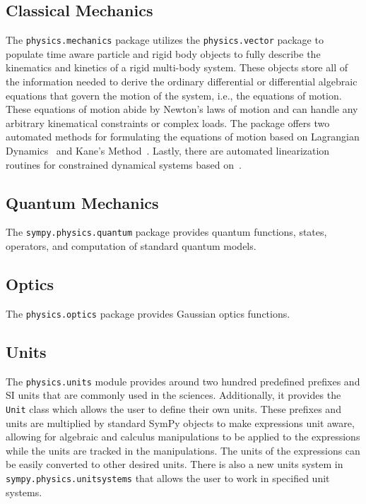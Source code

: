 \subsection{Classical Mechanics}

The \verb|physics.mechanics| package utilizes the \verb|physics.vector| package
to populate time aware particle and rigid body objects to fully describe the
kinematics and kinetics of a rigid multi-body system. These objects store all
of the information needed to derive the ordinary differential or differential
algebraic equations that govern the motion of the system, i.e., the equations
of motion. These equations of motion abide by Newton's laws of motion and can
handle any arbitrary kinematical constraints or complex loads. The package
offers two automated methods for formulating the equations of motion based on
Lagrangian Dynamics~\cite{Lagrange1811} and Kane's Method~\cite{Kane1985}. Lastly, there
are automated linearization routines for constrained dynamical
systems based on~\cite{Peterson2014}.

\subsection{Quantum Mechanics}

The \verb|sympy.physics.quantum| package provides quantum functions, states,
operators, and computation of standard quantum models.


\subsection{Optics}

The \verb|physics.optics| package provides Gaussian optics functions.


\subsection{Units}

The \verb|physics.units| module provides around two hundred predefined prefixes
and SI units that are commonly used in the sciences. Additionally, it provides
the \verb|Unit| class which allows the user to define their own units.  These
prefixes and units are multiplied by standard SymPy objects to make expressions
unit aware, allowing for algebraic and calculus manipulations to be applied to
the expressions while the units are tracked in the manipulations.  The units of
the expressions can be easily converted to other desired units.  There is also
a new units system in \verb|sympy.physics.unitsystems| that allows the user to
work in specified unit systems.

